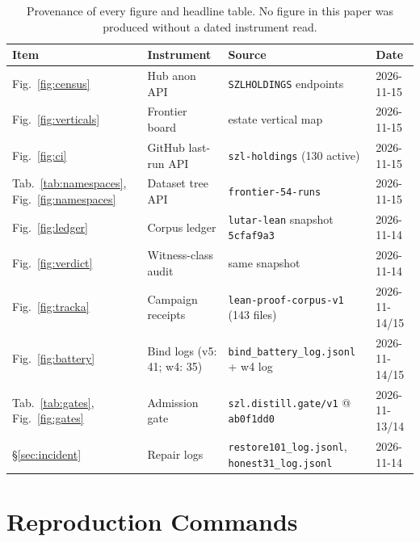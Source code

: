 ﻿\documentclass[11pt]{article}
\begin{document}
\begin{table}[htbp]
\centering
\scriptsize
\begin{tabular}{llll}
\toprule
\textbf{Item} & \textbf{Instrument} & \textbf{Source} & \textbf{Date} \\
\midrule
Fig.~\ref{fig:census} & Hub anon API & \texttt{SZLHOLDINGS} endpoints & 2026-11-15 \\
Fig.~\ref{fig:verticals} & Frontier board & estate vertical map & 2026-11-15 \\
Fig.~\ref{fig:ci} & GitHub last-run API & \texttt{szl-holdings} (130 active) & 2026-11-15 \\
Tab.~\ref{tab:namespaces}, Fig.~\ref{fig:namespaces} & Dataset tree API & \texttt{frontier-54-runs} & 2026-11-15 \\
Fig.~\ref{fig:ledger} & Corpus ledger & \texttt{lutar-lean} snapshot \texttt{5cfaf9a3} & 2026-11-14 \\
Fig.~\ref{fig:verdict} & Witness-class audit & same snapshot & 2026-11-14 \\
Fig.~\ref{fig:tracka} & Campaign receipts & \texttt{lean-proof-corpus-v1} (143 files) & 2026-11-14/15 \\
Fig.~\ref{fig:battery} & Bind logs (v5: 41; w4: 35) & \texttt{bind\_battery\_log.jsonl} + w4 log & 2026-11-14/15 \\
Tab.~\ref{tab:gates}, Fig.~\ref{fig:gates} & Admission gate & \texttt{szl.distill.gate/v1} @ \texttt{ab0f1dd0} & 2026-11-13/14 \\
\S\ref{sec:incident} & Repair logs & \texttt{restore101\_log.jsonl}, \texttt{honest31\_log.jsonl} & 2026-11-14 \\
\bottomrule
\end{tabular}
\caption{Provenance of every figure and headline table. No figure in this paper was produced without a dated instrument read.}
\label{tab:provenance}
\end{table}

\section{Reproduction Commands}
\label{app:commands}
\end{document}
